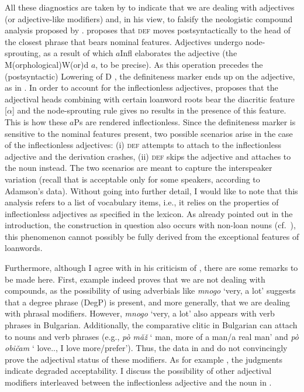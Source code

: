 \documentclass[output=paper]{langscibook}
\begin{document}

\noindent All these diagnostics are taken by \citet[94]{Adamson2019PhD} to indicate that we are dealing with adjectives (or adjective-like modifiers) and, in his view, to falsify the neologistic compound analysis proposed by \citet{Halpern1995}. \citet{Adamson2019PhD} proposes that \textsc{def} moves postsyntactically to the head of the closest phrase that bears nominal features. Adjectives undergo node-sprouting, as a result of which $a$Infl elaborates the adjective (the M(orphological)W(or)d $a$, to be precise). As this operation precedes the (postsyntactic) Lowering of D \citep[see][]{EmbickNoyer2001}, the definiteness marker ends up on the adjective, as in . In order to account for the inflectionless adjectives, \citet[96]{Adamson2019PhD} proposes that the adjectival heads combining with certain loanword roots bear the diacritic feature [$\alpha$] and the node-sprouting rule gives no results in the presence of this feature. This is how these $a$Ps are rendered inflectionless. Since the definiteness marker is sensitive to the nominal features present, two possible scenarios arise in the case of the inflectionless adjectives: (i) \textsc{def} attempts to attach to the inflectionless adjective and the derivation crashes, (ii) \textsc{def} skips the adjective and attaches to the noun instead. The two scenarios are meant to capture the interspeaker variation (recall that  is acceptable only for some speakers, according to Adamson's data). Without going into further detail, I would like to note that this analysis refers to a list of vocabulary items, i.e., it relies on the properties of inflectionless adjectives as specified in the lexicon. As already pointed out in the introduction, the construction in question also occurs with non-loan nouns (cf.\ ), this phenomenon cannot possibly be fully derived from the exceptional features of loanwords. 

Furthermore, although I agree with \citet{Adamson2019PhD} in his criticism of \citet{Halpern1995}, there are some remarks to be made here. First, example  indeed proves that we are not dealing with compounds, as the possibility of using adverbials like \emph{mnogo} `very, a lot' suggests that a degree phrase (DegP) is present, and more generally, that we are dealing with phrasal modifiers. However, \emph{mnogo} `very, a lot' also appears with verb phrases in Bulgarian. Additionally, the comparative clitic in Bulgarian can attach to nouns and verb phrases (e.g., \emph{p\`{o} m\u{a}\v{z}} `\Cmpr{} man, more of a man/a real man' and \emph{p\`{o} obi\v{c}am} `\Cmpr{} love.\Prs{}.\Fsg{}, I love more/prefer'). Thus, the data in  and  do not convincingly prove the adjectival status of these modifiers. As for example , the judgments indicate degraded acceptability. I discuss the possibility of other adjectival modifiers interleaved between the inflectionless adjective and the noun in .
\end{document}
